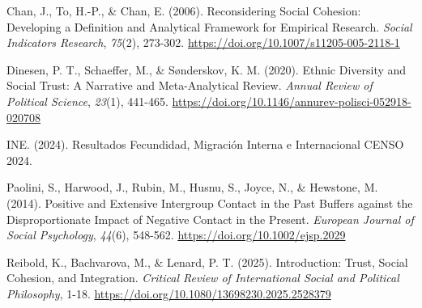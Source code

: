 \documentclass[
  spanish,
  letterpaper,
  DIV=11,
  numbers=noendperiod,
  oneside]{scrartcl}
\newlength{\cslhangindent}
\newenvironment{CSLReferences}[2] %
 {\begin{list}{}{%
  \setlength{\itemindent}{0pt}
  \setlength{\leftmargin}{0pt}
  \setlength{\parsep}{0pt}
  \ifodd #1
   \setlength{\leftmargin}{\cslhangindent}
   \setlength{\itemindent}{-1\cslhangindent}
  \fi
  \setlength{\itemsep}{#2\baselineskip}}}
 {\end{list}}
\begin{document}
\label{refs}
\begin{CSLReferences}{1}{0}
Chan, J., To, H.-P., \& Chan, E. (2006). Reconsidering {Social
Cohesion}: {Developing} a {Definition} and {Analytical Framework} for
{Empirical Research}. \emph{Social Indicators Research}, \emph{75}(2),
273-302. \url{https://doi.org/10.1007/s11205-005-2118-1}

Dinesen, P. T., Schaeffer, M., \& Sønderskov, K. M. (2020). Ethnic
{Diversity} and {Social Trust}: {A Narrative} and {Meta-Analytical
Review}. \emph{Annual Review of Political Science}, \emph{23}(1),
441-465. \url{https://doi.org/10.1146/annurev-polisci-052918-020708}

INE. (2024). Resultados {Fecundidad}, Migraci{ó}n Interna e
Internacional {CENSO} 2024.

Paolini, S., Harwood, J., Rubin, M., Husnu, S., Joyce, N., \& Hewstone,
M. (2014). Positive and Extensive Intergroup Contact in the Past Buffers
against the Disproportionate Impact of Negative Contact in the Present.
\emph{European Journal of Social Psychology}, \emph{44}(6), 548-562.
\url{https://doi.org/10.1002/ejsp.2029}

Reibold, K., Bachvarova, M., \& Lenard, P. T. (2025). Introduction:
Trust, Social Cohesion, and Integration. \emph{Critical Review of
International Social and Political Philosophy}, 1-18.
\url{https://doi.org/10.1080/13698230.2025.2528379}

\end{CSLReferences}
\end{document}
